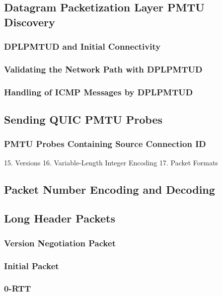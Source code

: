 \documentclass{article}
\begin{document}
\subsection{Datagram Packetization Layer PMTU Discovery}

\subsubsection{DPLPMTUD and Initial Connectivity}

\subsubsection{Validating the Network Path with DPLPMTUD}

\subsubsection{Handling of ICMP Messages by DPLPMTUD}

\subsection{Sending QUIC PMTU Probes}

\subsubsection{PMTU Probes Containing Source Connection ID}

15. Versions 16. Variable-Length Integer Encoding 17. Packet Formats

\subsection{Packet Number Encoding and Decoding}

\subsection{Long Header Packets}

\subsubsection{Version Negotiation Packet}

\subsubsection{Initial Packet}

\subsubsection{0-RTT}
\end{document}
